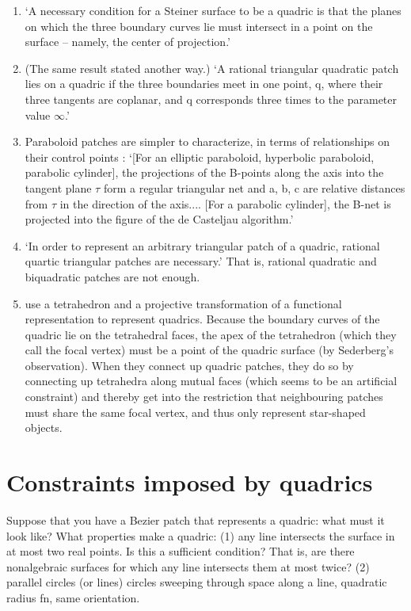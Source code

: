 \begin{enumerate}
\item
	`A necessary condition for a Steiner surface to be a quadric
	is that the planes on which the three boundary curves lie must
	intersect in a point on the surface -- namely, the center of projection.'
	\cite[p. 34]{Seder85}
\item
	(The same result stated another way.)
	`A rational triangular quadratic patch lies on a quadric if
	the three boundaries meet in one point, q, where their three tangents 
	are coplanar, and q corresponds three times to the parameter value
	$\infty$.' \cite[p. 7]{Boehm91}
\item
	Paraboloid patches are simpler to characterize, in terms of relationships
	on their control points \cite[p. 5]{Boehm91}:
	`[For an elliptic paraboloid, hyperbolic paraboloid, parabolic cylinder],
	the projections of the B-points along the axis into the tangent plane
	$\tau$ form a regular triangular net and a, b, c are relative distances 
	from $\tau$ in the direction of the axis....
	[For a parabolic cylinder], the B-net is projected into the figure
	of the de Casteljau algorithm.'
\item
	`In order to represent an arbitrary triangular patch of a quadric,
	rational quartic triangular patches are necessary.' \cite[p. 14]{Boehm91}
	That is, rational quadratic and biquadratic patches are not enough.
\item
	\cite{Lodha90}
	use a tetrahedron and a projective transformation of a functional
	representation to represent quadrics.
	Because the boundary curves of the quadric lie on the tetrahedral faces,
	the apex of the tetrahedron (which they call the focal vertex)
	must be a point of the quadric surface (by Sederberg's observation).
	When they connect up quadric patches, they do so by connecting up
	tetrahedra along mutual faces (which seems to be an artificial constraint)
	and thereby get into the restriction that neighbouring patches must
	share the same focal vertex, and thus only represent star-shaped objects.
\end{enumerate}

\section{Constraints imposed by quadrics}

Suppose that you have a Bezier patch that 
represents a quadric: what must it look like?
What properties make a quadric: 
	(1) any line intersects 
the surface in at most two real points.
Is this a sufficient condition?  
That is, are there nonalgebraic surfaces for which 
any line intersects them at most twice?
	(2) parallel circles (or lines)
	    circles sweeping through space along a line,
	    quadratic radius fn, same orientation.

